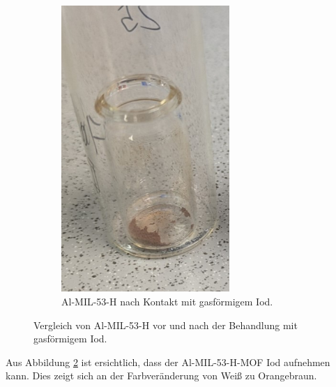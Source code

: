\documentclass[12pt, a4paper]{article}
\begin{document}
\begin{figure}[h!]
\begin{subfigure}[b]{0.45\textwidth}
        \includegraphics[width=0.7\textwidth]{MOF25Inach.jpg}
        \caption{Al-MIL-53-H nach Kontakt mit gasförmigem Iod.}
        \label{VergleichMOF25Inach}
    \end{subfigure}
    \caption{Vergleich von Al-MIL-53-H vor und nach der Behandlung mit gasförmigem Iod.}
    \label{VergleichMOF25I}
\end{figure}
\noindent
Aus Abbildung \ref{VergleichMOF25I} ist ersichtlich, dass der Al-MIL-53-H-MOF Iod aufnehmen kann. Dies zeigt sich an der Farbveränderung von Weiß zu Orangebraun.
\newpage
\end{document}
